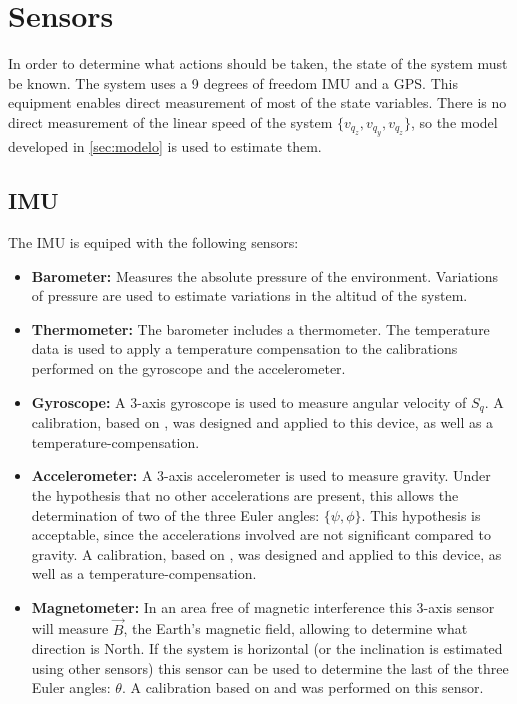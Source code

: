\documentclass[conference]{IEEEtran}
\begin{document}
\section{Sensors}

In order to determine what actions should be taken, the state of the system must be known. The system uses a 9 degrees of freedom IMU and a GPS. This equipment enables direct measurement of most of the state variables. There is no direct measurement of the linear speed of the system $\{v_{q_z},v_{q_y},v_{q_z}\}$, so the model developed in \ref{sec:modelo} is used to estimate them.

\subsection{IMU}
\label{sec:sensors-imu}

The IMU is equiped with the following sensors:
\begin{itemize}
\item \textbf{Barometer:} Measures the absolute pressure of the environment. Variations of pressure are used to estimate variations in the altitud of the system.
\item \textbf{Thermometer:} The barometer includes a thermometer. The temperature data is used to apply a temperature compensation to the calibrations performed on the gyroscope and the accelerometer.
\item \textbf{Gyroscope:} A 3-axis gyroscope is used to measure angular velocity of $S_q$. A calibration, based on \cite{bib:calib_imu}, was designed and applied to this device, as well as a temperature-compensation.
\item \textbf{Accelerometer:} A 3-axis accelerometer is used to measure gravity. Under the hypothesis that no other accelerations are present, this allows the determination of two of the three Euler angles: $\{\psi, \phi\}$. This hypothesis is acceptable, since the accelerations involved are not significant compared to gravity. A calibration, based on \cite{bib:calib_imu}, was designed and applied to this device, as well as a temperature-compensation.
\item \textbf{Magnetometer:} In an area free of magnetic interference this 3-axis sensor will measure $\vec{B}$, the Earth's magnetic field, allowing to determine what direction is North. If the system is horizontal (or the inclination is estimated using other sensors) this sensor can be used to determine the last of the three Euler angles: $\theta$. A calibration based on \cite{bib:bola} and \cite{bib:alain} was performed on this sensor.
\end{itemize}
\end{document}
